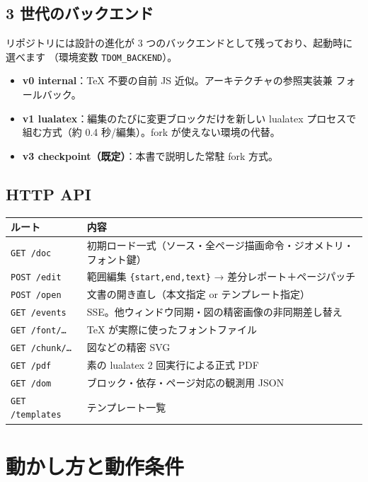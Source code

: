 \documentclass[11pt,a4paper]{ltjsarticle}
\newcommand{\code}[1]{\texttt{#1}}
\begin{document}
\subsection{3 世代のバックエンド}

リポジトリには設計の進化が 3 つのバックエンドとして残っており、起動時に選べます
（環境変数 \code{TDOM\_BACKEND}）。

\begin{itemize}
\item \textbf{v0 internal}：TeX 不要の自前 JS 近似。アーキテクチャの参照実装兼
  フォールバック。
\item \textbf{v1 lualatex}：編集のたびに変更ブロックだけを新しい lualatex プロセスで
  組む方式（約 0.4 秒/編集）。fork が使えない環境の代替。
\item \textbf{v3 checkpoint（既定）}：本書で説明した常駐 fork 方式。
\end{itemize}

\subsection{HTTP API}

\begin{center}
\small
\begin{tabular}{lp{}}
\toprule
ルート & 内容 \\
\midrule
\code{GET /doc} & 初期ロード一式（ソース・全ページ描画命令・ジオメトリ・フォント鍵） \\
\code{POST /edit} & 範囲編集 \code{\{start,end,text\}} → 差分レポート＋ページパッチ \\
\code{POST /open} & 文書の開き直し（本文指定 or テンプレート指定） \\
\code{GET /events} & SSE。他ウィンドウ同期・図の精密画像の非同期差し替え \\
\code{GET /font/…} & TeX が実際に使ったフォントファイル \\
\code{GET /chunk/…} & 図などの精密 SVG \\
\code{GET /pdf} & 素の lualatex 2 回実行による正式 PDF \\
\code{GET /dom} & ブロック・依存・ページ対応の観測用 JSON \\
\code{GET /templates} & テンプレート一覧 \\
\bottomrule
\end{tabular}
\end{center}

\section{動かし方と動作条件}
\end{document}
